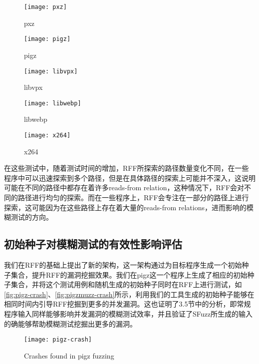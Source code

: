 \begin{figure}[ht]
    \centering
    \texttt{[image: pxz]}
    \caption{\label{fig:pxz}pxz}
\end{figure}

\begin{figure}[ht]
    \centering
    \texttt{[image: pigz]}
    \caption{\label{fig:pigz}pigz}
\end{figure}

\begin{figure}[ht]
    \centering
    \texttt{[image: libvpx]}
    \caption{\label{fig:libvpx}libvpx}
\end{figure}

\begin{figure}[ht]
    \centering
    \texttt{[image: libwebp]}
    \caption{\label{fig:libwebp}libwebp}
\end{figure}

\begin{figure}[ht]
    \centering
    \texttt{[image: x264]}
    \caption{\label{fig:x264}x264}
\end{figure}

在这些测试中，随着测试时间的增加，RFF所探索的路径数量变化不同，在一些程序中可以迅速探索到多个路径，但是在具体路径的探索上可能并不深入，这说明可能在不同的路径中都存在着许多reads-from relation，这种情况下，RFF会对不同的路径进行均匀的探索。而在一些程序上，RFF会专注在一部分的路径上进行探索，这可能因为在这些路径上存在着大量的reads-from relations，进而影响的模糊测试的方向。

\subsection{初始种子对模糊测试的有效性影响评估}

我们在RFF的基础上提出了新的架构，这一架构通过为目标程序生成一个初始种子集合，提升RFF的漏洞挖掘效果。我们在pigz这一个程序上生成了相应的初始种子集合，并将这个测试用例和随机生成的初始种子同时在RFF上进行测试，如\autoref{fig:pigz-crash}、\autoref{fig:pigzmuzz-crash}所示，利用我们的工具生成的初始种子能够在相同时间内引导RFF挖掘到更多的并发漏洞。这也证明了3.5节中的分析，即常规程序输入同样能够影响并发漏洞的模糊测试效率，并且验证了SFuzz所生成的输入的确能够帮助模糊测试挖掘出更多的漏洞。

\begin{figure}[ht]
    \centering
    \texttt{[image: pigz-crash]}
    \caption{\label{fig:pigz-crash}Crashes found in pigz fuzzing}
\end{figure}

